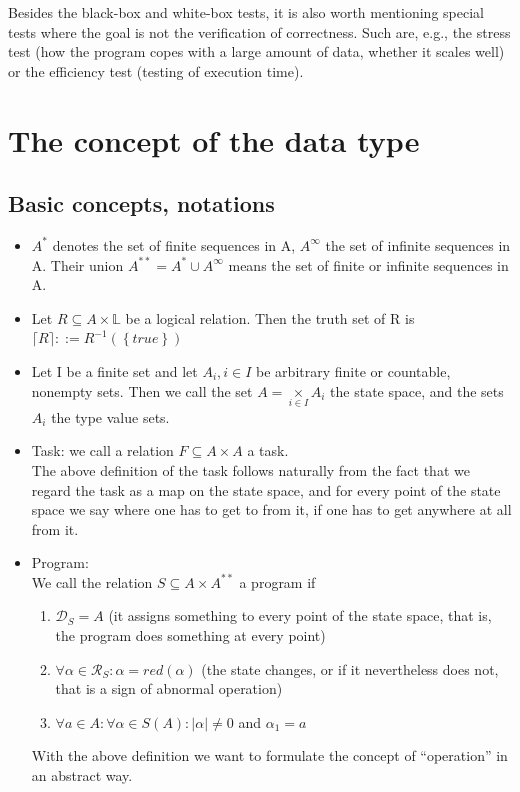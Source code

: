\documentclass[margin=0px]{article}
\begin{document}
Besides the black-box and white-box tests, it is also worth mentioning special tests where the goal is not the verification of correctness. Such are, e.g., the stress test (how the program copes with a large amount of data, whether it scales well) or the efficiency test (testing of execution time).

\section{The concept of the data type}

\subsection{Basic concepts, notations}

\begin{itemize}

    \item	$A^{*}$ denotes the set of finite sequences in A, $A^{\infty}$ the set of infinite sequences in A.
          Their union $A^{**} = A^{*} \cup A^{\infty}$ means the set of finite or infinite sequences in A.

    \item	Let $R \subseteq A \times \mathbb{L}$ be a logical relation. Then the truth set of R is
          $\lceil R \rceil ::= R^{-1}(\left\{{true}\right\}) $

    \item	Let I be a finite set and let $A_{i}, i \in I$ be arbitrary finite or countable, nonempty sets.
          Then we call the set $A = \underset{i \in I}{\times} A_{i}$ the state space, and the sets $A_{i}$ the type value sets.

    \item	Task: we call a relation $F \subseteq A \times A$ a task.\\
          The above definition of the task follows naturally from the fact that we regard the task as a
          map on the state space, and for every point of the state space we say
          where one has to get to from it, if one has to get anywhere at all from it.

    \item Program:\\
          We call the relation $S \subseteq A \times A^{**}$ a program if
          \begin{enumerate}
              \item	$\mathcal{D}_{S}=A$ (it assigns something to every point of the state space, that is, the program does something at every point)
              \item	$\forall \alpha \in \mathcal{R}_{S} : \alpha = red(\alpha)$ (the state changes, or if it nevertheless does not, that is a sign of abnormal operation)
              \item	$\forall a \in A : \forall \alpha \in S(A) : |\alpha| \not = 0$ and $\alpha_{1}=a$
          \end{enumerate}
          \noindent With the above definition we want to formulate the concept of ``operation'' in an abstract way.

\end{itemize}
\end{document}
